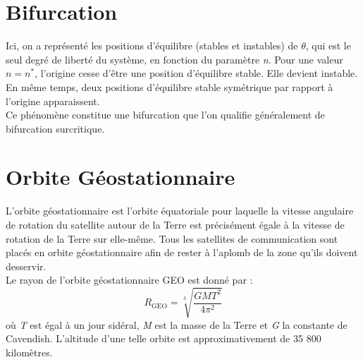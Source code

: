 \documentclass[a4paper]{article}
\begin{document}
\section{Bifurcation}





\begin{center}  \end{center}

Ici, on a représenté les positions d'équilibre (stables et instables) de $ \theta $, qui est le seul degré de liberté du système, en fonction du paramètre \emph{n}. Pour une valeur $ n = n^* $, l'origine cesse d'être une position d'équilibre stable. Elle devient instable. En même temps, deux positions d'équilibre stable symétrique par rapport à l'origine apparaissent. \\
Ce phénomène constitue une bifurcation que l'on qualifie généralement de bifurcation surcritique.










\section{Orbite Géostationnaire}





L’orbite géostationnaire est l’orbite équatoriale pour laquelle la vitesse angulaire de rotation du satellite autour de la Terre est précisément égale à la vitesse de rotation de la Terre sur elle-même. Tous les satellites de communication sont placés en orbite géostationnaire afin de rester à l’aplomb de la zone qu’ils doivent desservir. \\
Le rayon de l’orbite géostationnaire GEO est donné par :
\[ R_{\text{GEO}} = \sqrt[3]{\frac{G M T^2}{4 \pi^2}} \]
où \emph{T} est égal à un jour sidéral, \emph{M} est la masse de la Terre et \emph{G} la constante de Cavendish. L’altitude d’une telle orbite est approximativement de 35 800 kilomètres.
\end{document}
